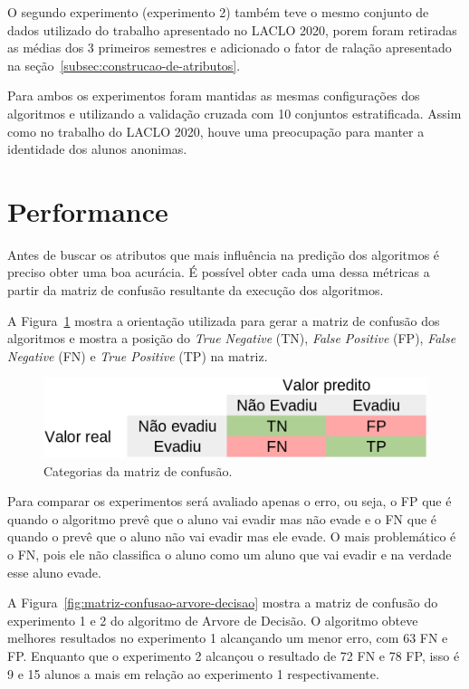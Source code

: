 \documentclass[diss,capa]{texufpel}
\begin{document}
O segundo experimento (experimento 2) também teve o mesmo conjunto de dados utilizado do trabalho apresentado no LACLO 2020, porem foram retiradas as médias dos 3 primeiros semestres e adicionado o fator de ralação apresentado na seção~\ref{subsec:construcao-de-atributos}.

Para ambos os experimentos foram mantidas as mesmas configurações dos algoritmos e utilizando a validação cruzada com 10 conjuntos estratificada.
Assim como no trabalho do LACLO 2020, houve uma preocupação para manter a identidade dos alunos anonimas.

\section{Performance}

Antes de buscar os atributos que mais influência na predição dos algoritmos é preciso obter uma boa acurácia.
É possível obter cada uma dessa métricas a partir da matriz de confusão resultante da execução dos algoritmos.

A Figura~\ref{fig:matriz-confusao-categorias} mostra a orientação utilizada para gerar a matriz de confusão dos algoritmos e mostra a posição do \textit{True Negative} (TN), \textit{False Positive} (FP), \textit{False Negative} (FN) e \textit{True Positive} (TP) na matriz.

\begin{figure}[htbp]
\centering \includegraphics[scale=.4]{imagens/modelo-matriz-confusao.png}
\caption{Categorias da matriz de confusão.}
\label{fig:matriz-confusao-categorias}
\end{figure}

Para comparar os experimentos será avaliado apenas o erro, ou seja, o FP que é quando o algoritmo prevê que o aluno vai evadir mas não evade e o FN que é quando o prevê que o aluno não vai evadir mas ele evade.
O mais problemático é o FN, pois ele não classifica o aluno como um aluno que vai evadir e na verdade esse aluno evade.

A Figura~\ref{fig:matriz-confusao-arvore-decisao} mostra a matriz de confusão do experimento 1 e 2 do algoritmo de Arvore de Decisão.
O algoritmo obteve melhores resultados no experimento 1 alcançando um menor erro, com 63 FN e FP.
Enquanto que o experimento 2 alcançou o resultado de 72 FN e 78 FP, isso é 9 e 15 alunos a mais em relação ao experimento 1 respectivamente.
\end{document}
